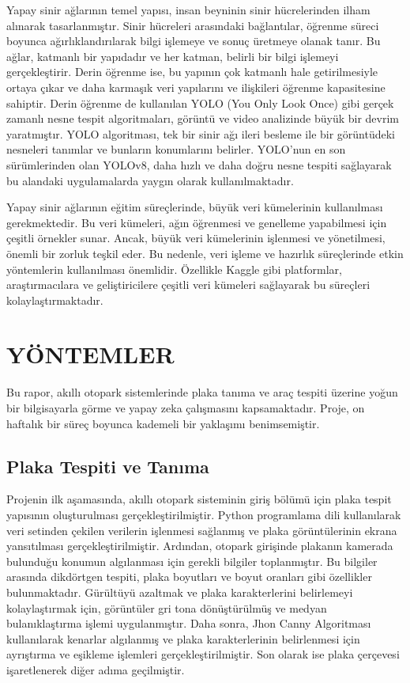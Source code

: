 \documentclass[]{article}
\begin{document}
	Yapay sinir ağlarının temel yapısı, insan beyninin sinir hücrelerinden ilham alınarak tasarlanmıştır. Sinir hücreleri arasındaki bağlantılar, öğrenme süreci boyunca ağırlıklandırılarak bilgi işlemeye ve sonuç üretmeye olanak tanır. Bu ağlar, katmanlı bir yapıdadır ve her katman, belirli bir bilgi işlemeyi gerçekleştirir. Derin öğrenme ise, bu yapının çok katmanlı hale getirilmesiyle ortaya çıkar ve daha karmaşık veri yapılarını ve ilişkileri öğrenme kapasitesine sahiptir. Derin öğrenme de kullanılan YOLO (You Only Look Once) gibi gerçek zamanlı nesne tespit algoritmaları, görüntü ve video analizinde büyük bir devrim yaratmıştır. YOLO algoritması, tek bir sinir ağı ileri besleme ile bir görüntüdeki nesneleri tanımlar ve bunların konumlarını belirler. YOLO'nun en son sürümlerinden olan YOLOv8, daha hızlı ve daha doğru nesne tespiti sağlayarak bu alandaki uygulamalarda yaygın olarak kullanılmaktadır\cite{kitap}\cite{kitap2}.
	
	Yapay sinir ağlarının eğitim süreçlerinde, büyük veri kümelerinin kullanılması gerekmektedir. Bu veri kümeleri, ağın öğrenmesi ve genelleme yapabilmesi için çeşitli örnekler sunar. Ancak, büyük veri kümelerinin işlenmesi ve yönetilmesi, önemli bir zorluk teşkil eder. Bu nedenle, veri işleme ve hazırlık süreçlerinde etkin yöntemlerin kullanılması önemlidir. Özellikle Kaggle gibi platformlar, araştırmacılara ve geliştiricilere çeşitli veri kümeleri sağlayarak bu süreçleri kolaylaştırmaktadır\cite{chatgpt35}.

 	
	\section{YÖNTEMLER}
	Bu rapor, akıllı otopark sistemlerinde plaka tanıma ve araç tespiti üzerine yoğun bir bilgisayarla görme ve yapay zeka çalışmasını kapsamaktadır. Proje, on haftalık bir süreç boyunca kademeli bir yaklaşımı benimsemiştir.
	
	\subsection{Plaka Tespiti ve Tanıma}
	Projenin ilk aşamasında, akıllı otopark sisteminin giriş bölümü için plaka tespit yapısının oluşturulması gerçekleştirilmiştir. Python programlama dili kullanılarak veri setinden çekilen verilerin işlenmesi sağlanmış ve plaka görüntülerinin ekrana yansıtılması gerçekleştirilmiştir. Ardından, otopark girişinde plakanın kamerada bulunduğu konumun algılanması için gerekli bilgiler toplanmıştır. Bu bilgiler arasında dikdörtgen tespiti, plaka boyutları ve boyut oranları gibi özellikler bulunmaktadır. Gürültüyü azaltmak ve plaka karakterlerini belirlemeyi kolaylaştırmak için, görüntüler gri tona dönüştürülmüş ve medyan bulanıklaştırma işlemi uygulanmıştır. Daha sonra, Jhon Canny Algoritması kullanılarak kenarlar algılanmış ve plaka karakterlerinin belirlenmesi için ayrıştırma ve eşikleme işlemleri gerçekleştirilmiştir. Son olarak ise plaka çerçevesi işaretlenerek diğer adıma geçilmiştir\cite{github}.
	
\end{document}
